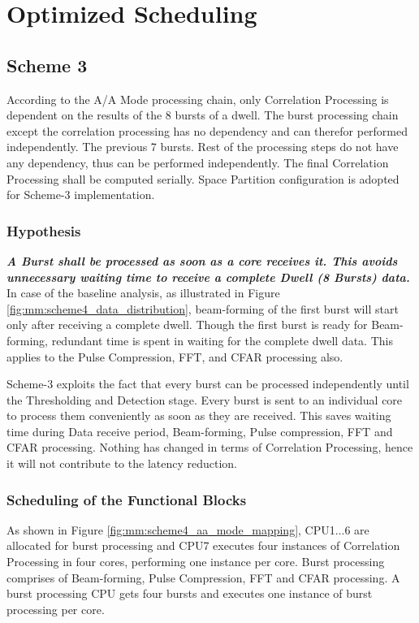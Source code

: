 \chapter{Optimized Scheduling}
\label{chap:mode_mapping}

\section{Scheme 3}
\label{sec:mm:scheme4}
According to the A/A Mode processing chain, only Correlation Processing is dependent on the results of the 8 bursts of a dwell. The burst processing chain except the correlation processing has no dependency and can therefor performed independently. The previous 7 bursts. Rest of the processing steps do not have any dependency, thus can be performed independently. The final Correlation Processing shall be computed serially. Space Partition configuration is adopted for Scheme-3 implementation.

\subsection{Hypothesis}
\textbf{\textsl{A Burst shall be processed as soon as a core receives it. This avoids unnecessary waiting time to receive a complete Dwell (8 Bursts) data.}}\\[0.2cm]
In case of the baseline analysis, as illustrated in Figure \ref{fig:mm:scheme4_data_distribution}, beam-forming of the first burst will start only after receiving a complete dwell. Though the first burst is ready for Beam-forming, redundant time is spent in waiting for the complete dwell data. This applies to the Pulse Compression, FFT, and CFAR processing also.

Scheme-3 exploits the fact that every burst can be processed independently until the Thresholding and Detection stage. Every burst is sent to an individual core to process them conveniently as soon as they are received. This saves waiting time during Data receive period, Beam-forming, Pulse compression, FFT and CFAR processing. Nothing has changed in terms of Correlation Processing, hence it will not contribute to the latency reduction.

\subsection{Scheduling of the Functional Blocks}
As shown in Figure \ref{fig:mm:scheme4_aa_mode_mapping}, CPU1...6 are allocated for burst processing and CPU7 executes four instances of Correlation Processing in four cores, performing one instance per core. Burst processing comprises of Beam-forming, Pulse Compression, FFT and CFAR processing. A burst processing CPU gets four bursts and executes one instance of burst processing per core.

